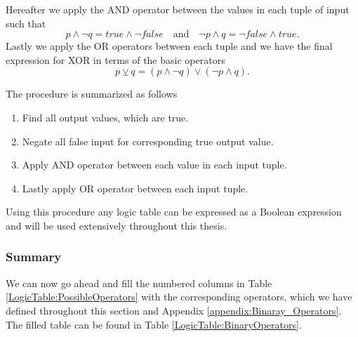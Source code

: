                 Hereafter we apply the AND operator between the values in each tuple of input such that
                \begin{equation}
                    p \wedge \neg q = true \wedge \neg false \quad \text{and} \quad \neg p \wedge q = \neg false \wedge true.
                \end{equation}
                Lastly we apply the OR operators between each tuple and we have the final expression for XOR in terms of the basic operators
                \begin{equation}
                    p \veebar q = (p \wedge \neg q) \vee (\neg p \wedge q).
                \end{equation}
                
                The procedure is summarized as follows
                \begin{enumerate}
                    \item Find all output values, which are true.
                    \item Negate all false input for corresponding true output value.
                    \item Apply AND operator between each value in each input tuple.
                    \item Lastly apply OR operator between each input tuple.
                \end{enumerate}
                Using this procedure any logic table can be expressed as a Boolean expression and will be used extensively throughout this thesis.
                
                
            \subsubsection{Summary}
            
                We can now go ahead and fill the numbered columns in Table \ref{LogicTable:PossibleOperators} with the corresponding operators, which we have defined throughout this section and Appendix \ref{appendix:Binaray_Operators}. The filled table can be found in Table \ref{LogicTable:BinaryOperators}. 
                
